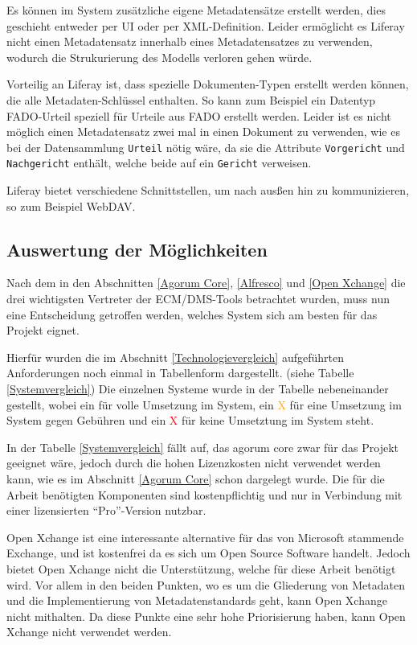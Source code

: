 Es k\"onnen im System zus\"atzliche eigene Metadatens\"atze erstellt werden, dies geschieht entweder per \ac{UI} oder per XML-Definition.
Leider erm\"oglicht es  Liferay nicht einen Metadatensatz innerhalb eines Metadatensatzes zu verwenden, wodurch die Strukurierung des Modells verloren gehen w\"urde.

Vorteilig an Liferay ist, dass spezielle Dokumenten-Typen erstellt werden k\"onnen, die alle Metadaten-Schl\"ussel enthalten. So kann zum Beispiel ein Datentyp \ac{FADO}-Urteil speziell f\"ur Urteile aus \ac{FADO} erstellt werden. Leider ist es nicht m\"oglich einen Metadatensatz zwei mal in einen Dokument zu verwenden, wie es bei der Datensammlung \texttt{Urteil} n\"otig w\"are, da sie die Attribute \texttt{Vorgericht} und \texttt{Nachgericht} enth\"alt, welche beide auf ein \texttt{Gericht} verweisen.

Liferay bietet verschiedene Schnittstellen, um nach aus\ss{}en hin zu kommunizieren, so zum Beispiel WebDAV.

\subsection{Auswertung der M\"oglichkeiten}\label{Auswertung ECM}
Nach dem in den Abschnitten \ref{Agorum Core}, \ref{Alfresco} und \ref{Open Xchange} die drei wichtigsten Vertreter der \ac{ECM}/\ac{DMS}-Tools
betrachtet wurden, muss nun eine Entscheidung getroffen werden, welches System sich am besten f\"ur das Projekt eignet.

Hierf\"ur wurden die im Abschnitt \ref{Technologievergleich} aufgef\"uhrten Anforderungen noch einmal in Tabellenform dargestellt. (siehe Tabelle \ref{Systemvergleich}) Die einzelnen Systeme wurde in der Tabelle nebeneinander gestellt, wobei ein \textcolor{green}{\checkmark} f\"ur volle Umsetzung im System, ein \textcolor{orange}{\checkmark X} f\"ur eine Umsetzung im System gegen Geb\"uhren und ein \textcolor{red}{X} f\"ur keine Umsetztung im System steht.

In der Tabelle \ref{Systemvergleich} f\"allt auf, das agorum core zwar f\"ur das Projekt geeignet w\"are, jedoch durch die hohen Lizenzkosten nicht verwendet werden kann, wie es im Abschnitt \ref{Agorum Core} schon dargelegt wurde. Die f\"ur die Arbeit ben\"otigten Komponenten sind kostenpflichtig und nur in Verbindung mit einer lizensierten "`Pro"'-Version nutzbar.

Open Xchange ist eine interessante alternative f\"ur das von Microsoft stammende Exchange, und ist kostenfrei da es sich um Open Source Software handelt. Jedoch bietet Open Xchange nicht die Unterst\"utzung, welche f\"ur diese Arbeit ben\"otigt wird. Vor allem in den beiden Punkten, wo es um die Gliederung von Metadaten und die Implementierung von Metadatenstandards geht, kann Open Xchange nicht mithalten. Da diese Punkte eine sehr hohe Priorisierung haben, kann Open Xchange nicht verwendet werden.

